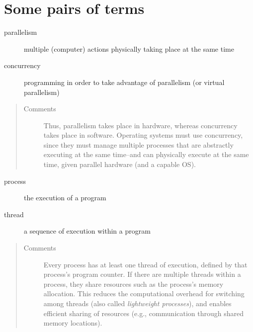 \documentclass[letterpaper,10pt,english]{sphinxmanual}
\begin{document}
\section{Some pairs of terms}
\label{Introduction/Introduction:some-pairs-of-terms}\begin{description}
\item[{parallelism}] \leavevmode{}\label{Introduction/Introduction:term-parallelism}
multiple (computer) actions physically taking place at the same time

\end{description}
\begin{description}
\item[{concurrency}] \leavevmode{}\label{Introduction/Introduction:term-concurrency}
programming in order to take advantage of parallelism (or virtual parallelism)

\end{description}
\begin{quote}\begin{description}
\item[{Comments}] \leavevmode
Thus, parallelism takes place in hardware, whereas concurrency takes place in software. Operating systems must use concurrency, since they must manage multiple processes that are abstractly executing at the same time--and can physically execute at the same time, given parallel hardware (and a capable OS).

\end{description}\end{quote}
\begin{description}
\item[{process}] \leavevmode{}\label{Introduction/Introduction:term-process}
the execution of a program

\end{description}
\begin{description}
\item[{thread}] \leavevmode{}\label{Introduction/Introduction:term-thread}
a sequence of execution within a program

\end{description}
\begin{quote}\begin{description}
\item[{Comments}] \leavevmode
Every process has at least one thread of execution, defined by that process's program counter. If there are multiple threads within a process, they share resources such as the process's memory allocation. This reduces the computational overhead for switching among threads (also called \emph{lightweight processes}), and enables efficient sharing of resources (e.g., communication through shared memory locations).

\end{description}\end{quote}
\end{document}
